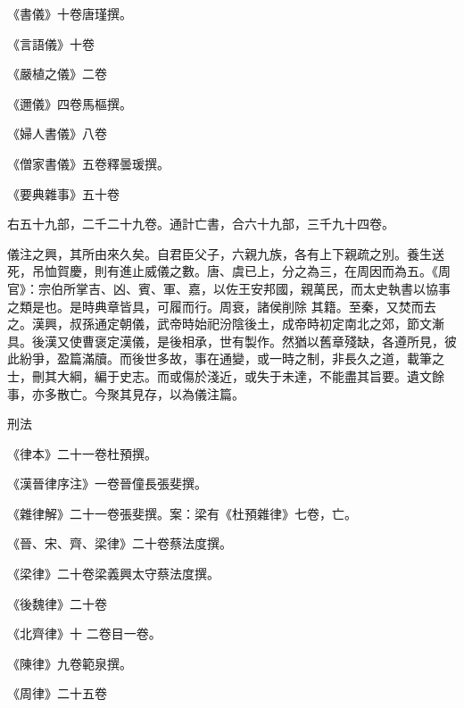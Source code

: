 \begin{pinyinscope}
 《書儀》十卷唐瑾撰。



 《言語儀》十卷



 《嚴植之儀》二卷



 《邇儀》四卷馬樞撰。



 《婦人書儀》八卷



 《僧家書儀》五卷釋曇瑗撰。



 《要典雜事》五十卷



 右五十九部，二千二十九卷。通計亡書，合六十九部，三千九十四卷。



 儀注之興，其所由來久矣。自君臣父子，六親九族，各有上下親疏之別。養生送死，吊恤賀慶，則有進止威儀之數。唐、虞已上，分之為三，在周因而為五。《周官》：宗伯所掌吉、凶、賓、軍、嘉，以佐王安邦國，親萬民，而太史執書以協事之類是也。是時典章皆具，可履而行。周衰，諸侯削除
 其籍。至秦，又焚而去之。漢興，叔孫通定朝儀，武帝時始祀汾陰後土，成帝時初定南北之郊，節文漸具。後漢又使曹褒定漢儀，是後相承，世有製作。然猶以舊章殘缺，各遵所見，彼此紛爭，盈篇滿牘。而後世多故，事在通變，或一時之制，非長久之道，載筆之士，刪其大綱，編于史志。而或傷於淺近，或失于未達，不能盡其旨要。遺文餘事，亦多散亡。今聚其見存，以為儀注篇。



 刑法



 《律本》二十一卷杜預撰。



 《漢晉律序注》一卷晉僮長張斐撰。



 《雜律解》二十一卷張斐撰。案：梁有《杜預雜律》七卷，亡。



 《晉、宋、齊、梁律》二十卷蔡法度撰。



 《梁律》二十卷梁義興太守蔡法度撰。



 《後魏律》二十卷



 《北齊律》十
 二卷目一卷。



 《陳律》九卷範泉撰。



 《周律》二十五卷




\end{pinyinscope}
